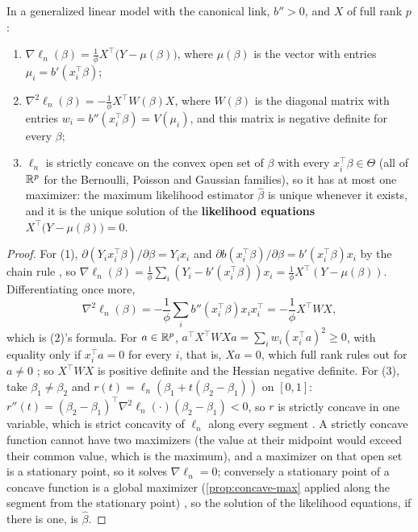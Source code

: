 \begin{theorem}
\label{thm:glm-concave}
In a generalized linear model with the canonical link, $b'' > 0$, and $X$ of full rank $p$:
\begin{enumerate}[nosep]
\item $\nabla\ell_n(\beta) = \frac{1}{\phi}X^\top\big(Y - \mu(\beta)\big)$, where $\mu(\beta)$ is the vector with entries $\mu_i = b'(x_i^\top\beta)$;
\item $\nabla^2\ell_n(\beta) = -\frac{1}{\phi}X^\top W(\beta)X$, where $W(\beta)$ is the diagonal matrix with entries $w_i = b''(x_i^\top\beta) = V(\mu_i)$, and this matrix is negative definite for every $\beta$;
\item $\ell_n$ is strictly concave on the convex open set of $\beta$ with every $x_i^\top\beta \in \Theta$ (all of $\mathbb{R}^p$ for the Bernoulli, Poisson and Gaussian families), so it has at most one maximizer: the maximum likelihood estimator $\hat{\beta}$ is unique whenever it exists, and it is the unique solution of the \textbf{likelihood equations} $X^\top\big(Y - \mu(\beta)\big) = 0$.
\end{enumerate}
\end{theorem}
\begin{proof}
For (1), $\partial(Y_i x_i^\top\beta)/\partial\beta = Y_i x_i$ and $\partial b(x_i^\top\beta)/\partial\beta = b'(x_i^\top\beta)x_i$ by the chain rule , so $\nabla\ell_n(\beta) = \frac1\phi\sum_i (Y_i - b'(x_i^\top\beta))x_i = \frac1\phi X^\top(Y - \mu(\beta))$.
Differentiating once more,
\[
\nabla^2\ell_n(\beta) = -\frac1\phi\sum_i b''(x_i^\top\beta)x_ix_i^\top = -\frac1\phi X^\top WX,
\]
which is (2)'s formula.
For $a \in \mathbb{R}^p$, $a^\top X^\top WXa = \sum_i w_i(x_i^\top a)^2 \geq 0$, with equality only if $x_i^\top a = 0$ for every $i$, that is, $Xa = 0$, which full rank rules out for $a \neq 0$ ; so $X^\top WX$ is positive definite and the Hessian negative definite.
For (3), take $\beta_1 \neq \beta_2$ and $r(t) = \ell_n(\beta_1 + t(\beta_2 - \beta_1))$ on $[0, 1]$: $r''(t) = (\beta_2 - \beta_1)^\top\nabla^2\ell_n(\cdot)(\beta_2 - \beta_1) < 0$, so $r$ is strictly concave in one variable, which is strict concavity of $\ell_n$ along every segment .
A strictly concave function cannot have two maximizers (the value at their midpoint would exceed their common value, which is the maximum), and a maximizer on that open set is a stationary point, so it solves $\nabla\ell_n = 0$; conversely a stationary point of a concave function is a global maximizer (\cref{prop:concave-max} applied along the segment from the stationary point) , so the solution of the likelihood equations, if there is one, is $\hat{\beta}$.
\end{proof}


